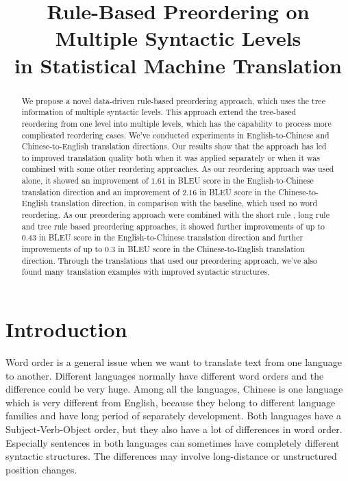 \documentclass[a4paper]{article}
\title{Rule-Based Preordering on
Multiple Syntactic Levels \\in Statistical Machine Translation}
\begin{document}
\maketitle
%
\begin{abstract}
We propose a novel data-driven rule-based preordering approach, which uses the tree information of multiple syntactic levels. This approach extend the tree-based reordering from one level into multiple levels, which has the capability to process more complicated reordering cases. We've conducted experiments in English-to-Chinese and Chinese-to-English translation directions. Our results show that the approach has led to improved translation quality both when it was applied separately or when it was combined with some other reordering approaches. As our reordering approach was used alone, it showed an improvement of $1.61$ in BLEU score in the English-to-Chinese translation direction and an improvement of $2.16$ in BLEU score in the Chinese-to-English translation direction, in comparison with the baseline, which used no word reordering. As our preordering approach were combined with the short rule \cite{short}, long rule \cite{long} and tree rule \cite{tree} based preordering approaches, it showed further improvements of up to $0.43$ in BLEU score in the English-to-Chinese translation direction and further improvements of up to $0.3$ in BLEU score in the Chinese-to-English translation direction. Through the translations that used our preordering approach, we've also found many translation examples with improved syntactic structures.

 

\end{abstract}
%
\section{Introduction}
\label{in}

Word order is a general issue when we want to translate text from one language to another. Different languages normally have different word orders and the difference could be very huge. Among all the languages, Chinese is one language which is very different from English, because they belong to different language families and have long period of separately development. Both languages have a Subject-Verb-Object order, but they also have a lot of differences in word order. Especially sentences in both languages can sometimes have completely different syntactic structures. The differences may involve long-distance or unstructured position changes.
\end{document}
